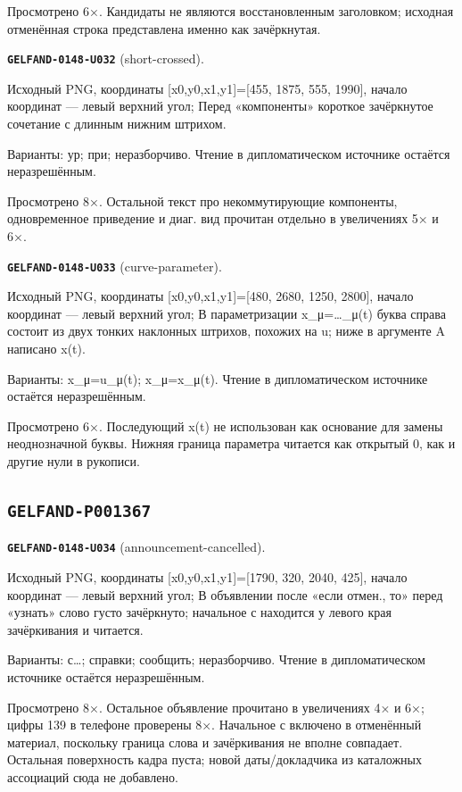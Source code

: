 \documentclass[11pt]{article}
\theoremstyle{definition}
\theoremstyle{remark}
\begin{document}
Просмотрено 6×. Кандидаты не являются восстановленным заголовком; исходная отменённая строка представлена именно как зачёркнутая.\par\medskip
\noindent\leavevmode{}\label{GELFAND-P001366:short-crossed:note}\textbf{\texttt{GELFAND-0148-U032}} (short-crossed).\par\nopagebreak[4]
Исходный PNG, координаты [x0,y0,x1,y1]=[455, 1875, 555, 1990], начало координат — левый верхний угол; Перед «компоненты» короткое зачёркнутое сочетание с длинным нижним штрихом.\par
Варианты: ур; при; неразборчиво. Чтение в дипломатическом источнике остаётся неразрешённым.\par
Просмотрено 8×. Остальной текст про некоммутирующие компоненты, одновременное приведение и диаг. вид прочитан отдельно в увеличениях 5× и 6×.\par\medskip
\noindent\leavevmode{}\label{GELFAND-P001366:curve-parameter:note}\textbf{\texttt{GELFAND-0148-U033}} (curve-parameter).\par\nopagebreak[4]
Исходный PNG, координаты [x0,y0,x1,y1]=[480, 2680, 1250, 2800], начало координат — левый верхний угол; В параметризации x\_μ=…\_μ(t) буква справа состоит из двух тонких наклонных штрихов, похожих на u; ниже в аргументе A написано x(t).\par
Варианты: x\_μ=u\_μ(t); x\_μ=x\_μ(t). Чтение в дипломатическом источнике остаётся неразрешённым.\par
Просмотрено 6×. Последующий x(t) не использован как основание для замены неоднозначной буквы. Нижняя граница параметра читается как открытый 0, как и другие нули в рукописи.\par\medskip

\subsection*{\texttt{GELFAND-P001367}}
\noindent\leavevmode{}\label{GELFAND-P001367:announcement-cancelled:note}\textbf{\texttt{GELFAND-0148-U034}} (announcement-cancelled).\par\nopagebreak[4]
Исходный PNG, координаты [x0,y0,x1,y1]=[1790, 320, 2040, 425], начало координат — левый верхний угол; В объявлении после «если отмен., то» перед «узнать» слово густо зачёркнуто; начальное с находится у левого края зачёркивания и читается.\par
Варианты: с…; справки; сообщить; неразборчиво. Чтение в дипломатическом источнике остаётся неразрешённым.\par
Просмотрено 8×. Остальное объявление прочитано в увеличениях 4× и 6×; цифры 139 в телефоне проверены 8×. Начальное с включено в отменённый материал, поскольку граница слова и зачёркивания не вполне совпадает. Остальная поверхность кадра пуста; новой даты/докладчика из каталожных ассоциаций сюда не добавлено.\par\medskip
\end{document}
